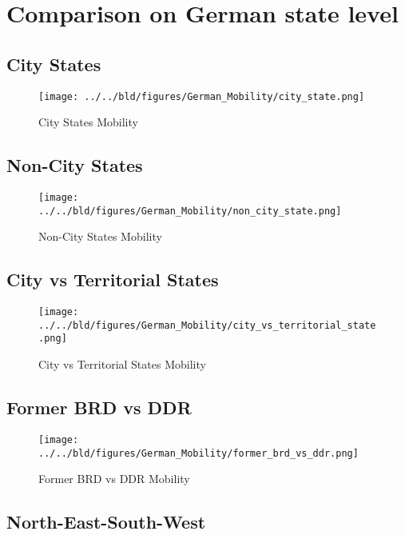 \documentclass[11pt, a4paper, leqno]{article}
\begin{document}
\newpage

\section{Comparison on German state level}
\subsection{City States}

\begin{figure}[t!]
	\centering
	\texttt{[image: ../../bld/figures/German\_Mobility/city\_state.png]}
	\caption{City States Mobility}
\end{figure}



\subsection{Non-City States}

\begin{figure}[t!]
	\centering
	\texttt{[image: ../../bld/figures/German\_Mobility/non\_city\_state.png]}
	\caption{Non-City States Mobility}
\end{figure}



\subsection{City vs Territorial States}

\begin{figure}[t!]
	\centering
	\texttt{[image: ../../bld/figures/German\_Mobility/city\_vs\_territorial\_state.png]}
	\caption{City vs Territorial States Mobility}
\end{figure}



\subsection{Former BRD vs DDR}

\begin{figure}[t!]
	\centering
	\texttt{[image: ../../bld/figures/German\_Mobility/former\_brd\_vs\_ddr.png]}
	\caption{Former BRD vs DDR Mobility}
\end{figure}



\subsection{North-East-South-West}
\end{document}
